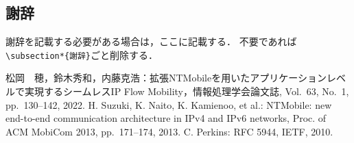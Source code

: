 \documentclass[a4j,10pt,twocolumn,uplatex]{jsarticle}
\begin{document}
\subsection*{謝辞}
謝辞を記載する必要がある場合は，ここに記載する．
不要であれば\verb|\subsection*{謝辞}|ごと削除する．


\begin{thebibliography}{9}	%
     松岡　穂，鈴木秀和，内藤克浩：拡張NTMobileを用いたアプリケーションレベルで実現するシームレスIP Flow Mobility，情報処理学会論文誌, Vol.~63, No.~1, pp.~130--142, 2022.
     H. Suzuki, K. Naito, K. Kamienoo, et al.: NTMobile: new end-to-end communication architecture in IPv4 and IPv6 networks, Proc. of ACM MobiCom 2013, pp.~171--174, 2013.
     C. Perkins: RFC 5944, IETF, 2010.
\end{thebibliography}
\end{document}
